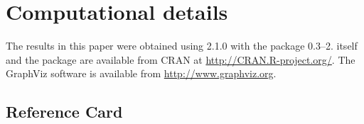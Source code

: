 \documentclass{Z}
\begin{document}
\section*{Computational details}

The results in this paper were obtained using  2.1.0 with
the package  0.3--2.  itself and the
 package are available from CRAN at
\url{http://CRAN.R-project.org/}.  The GraphViz software is available
from \url{http://www.graphviz.org}.


%


\newpage\mbox{}
\begin{appendix}
\section{Reference Card}
\label{sec:ref}

\end{appendix}
\end{document}
